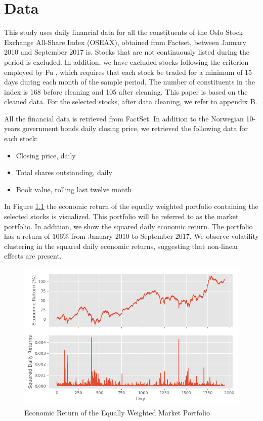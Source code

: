 \chapter{Data}
\label{Da}

This study uses daily financial data for all the constituents of the Oslo Stock Exchange All-Share Index (OSEAX), obtained from Factset, between January 2010 and September 2017 is. Stocks that are not continuously listed during the period is excluded. In addition, we have excluded stocks following the criterion employed by Fu \cite{Fu}, which requires that each stock be traded for a minimum of 15 days during each month of the sample period. The number of constituents in the index is 168 before cleaning and 105 after cleaning. This paper is based on the cleaned data. For the selected stocks, after data cleaning, we refer to appendix B. 

All the financial data is retrieved from FactSet. In addition to the Norwegian 10-years government bonds daily closing price, we retrieved the following data for each stock:
\begin{itemize}
    \item Closing price, daily
    \item Total shares outstanding, daily
    \item Book value, rolling last twelve month
\end{itemize}

In Figure \ref{MarketReturn} the economic return of the equally weighted portfolio containing the selected stocks is visualized. This portfolio will be referred to as the market portfolio. In addition, we show the squared daily economic return. The portfolio has a return of $106\%$ from January 2010 to September 2017. We observe volatility clustering in the squared daily economic returns, suggesting that non-linear effects are present.

\begin{figure}[h]
\label{MarketReturn}
    \centering
    \includegraphics[scale = 0.65]{Plot/MarketReturn.png}
    \caption{Economic Return of the Equally Weighted Market Portfolio}
    \label{MarketReturn}
\end{figure}

